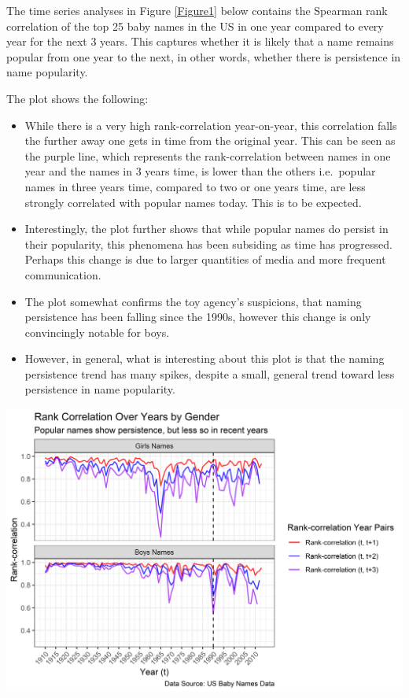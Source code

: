 \documentclass[11pt,preprint, authoryear]{elsarticle}
\let\origfigure\figure
\let\endorigfigure\endfigure
\renewenvironment{figure}[1][2] {
    \expandafter\origfigure\expandafter[H]
} {
    \endorigfigure
}
\numberwithin{equation}{section}
\numberwithin{figure}{section}
\numberwithin{table}{section}
\begin{document}
The time series analyses in Figure \ref{Figure1} below contains the
Spearman rank correlation of the top 25 baby names in the US in one year
compared to every year for the next 3 years. This captures whether it is
likely that a name remains popular from one year to the next, in other
words, whether there is persistence in name popularity.

The plot shows the following:

\begin{itemize}
\item
  While there is a very high rank-correlation year-on-year, this
  correlation falls the further away one gets in time from the original
  year. This can be seen as the purple line, which represents the
  rank-correlation between names in one year and the names in 3 years
  time, is lower than the others i.e.~popular names in three years time,
  compared to two or one years time, are less strongly correlated with
  popular names today. This is to be expected.
\item
  Interestingly, the plot further shows that while popular names do
  persist in their popularity, this phenomena has been subsiding as time
  has progressed. Perhaps this change is due to larger quantities of
  media and more frequent communication.
\item
  The plot somewhat confirms the toy agency's suspicions, that naming
  persistence has been falling since the 1990s, however this change is
  only convincingly notable for boys.
\item
  However, in general, what is interesting about this plot is that the
  naming persistence trend has many spikes, despite a small, general
  trend toward less persistence in name popularity.
\end{itemize}

\begin{figure}[H]

{\centering \includegraphics{Question_1_files/figure-latex/Figure1-1} 

}

\caption{Persistence of Popular Names \label{Figure1}}\label{fig:Figure1}
\end{figure}
\end{document}
